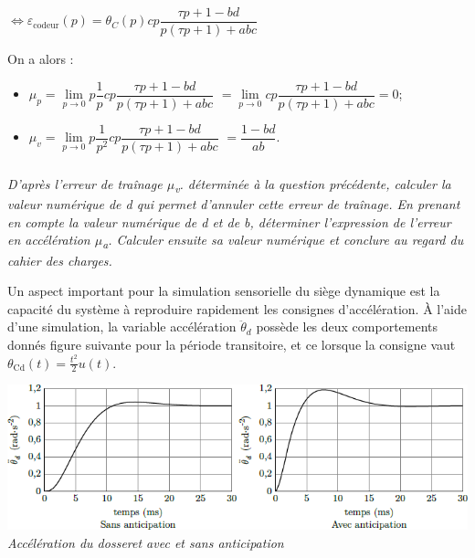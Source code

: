 \documentclass[10pt,fleqn]{article} %
\begin{document}
\begin{multicols}{2}
\begin{corrige}
$\Leftrightarrow \varepsilon_{\text{codeur}}(p) = \theta_C(p)  cp \dfrac{\tau p + 1 -bd}{p\left(\tau p + 1 \right)+abc} $

On a alors : 
\begin{itemize}
\item $\mu_p=\lim\limits_{p\to0}  p\dfrac{1}{p}  cp \dfrac{\tau p + 1 -bd}{p\left(\tau p + 1 \right)+abc}$ $=\lim\limits_{p\to0}  cp \dfrac{\tau p + 1 -bd}{p\left(\tau p + 1 \right)+abc}=0$;
\item $\mu_v=\lim\limits_{p\to0}  p\dfrac{1}{p^2}  cp \dfrac{\tau p + 1 -bd}{p\left(\tau p + 1 \right)+abc}$ 
$= \dfrac{1 -bd}{ab}$.
\end{itemize}

\end{corrige}
\else
\fi
  
\subparagraph{\label{q14}}\textit{D'après l'erreur de traînage $\mu$\emph{\textsubscript{v}}. déterminée à
  la question précédente, calculer la valeur numérique de d qui permet
  d'annuler cette erreur de traînage. En prenant en compte la valeur
  numérique de d et de b, déterminer l'expression de l'erreur en
  accélération $\mu$\emph{\textsubscript{a}}. Calculer ensuite sa valeur
  numérique et conclure au regard du cahier des charges.}
\ifprof
\begin{corrige}
\end{corrige}
\else
\fi

Un aspect important pour la simulation sensorielle du siège dynamique
est la capacité du système à reproduire rapidement les consignes
d'accélération. À l'aide d'une simulation, la variable accélération
\({\ddot{\theta}}_{d}\) possède les deux comportements donnés figure suivante
pour la période transitoire, et ce lorsque la consigne vaut
\(\theta_{\text{Cd}}\left( t \right) = \frac{t^{2}}{2}u(t)\).


\begin{center}
\includegraphics[width=1.0\linewidth]{images/image18.png}
\textit{Accélération du dosseret avec et sans anticipation \label{fig17}}
\end{center}


\end{multicols}
\end{document}
